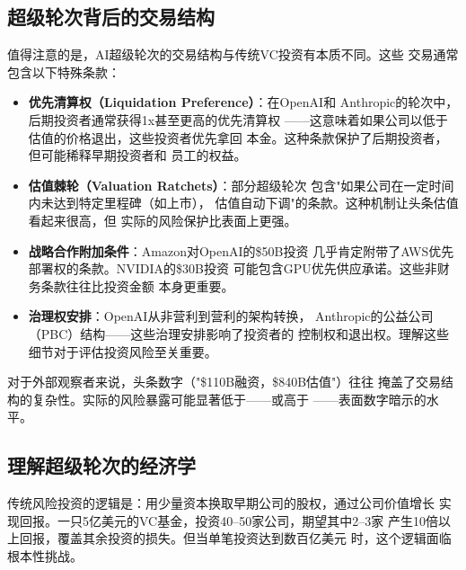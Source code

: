 \subsection{超级轮次背后的交易结构}
\label{subsec:fund-deal-structure}

值得注意的是，AI超级轮次的交易结构与传统VC投资有本质不同。这些
交易通常包含以下特殊条款：

\begin{itemize}
  \item \textbf{优先清算权（Liquidation Preference）}：在OpenAI和
    Anthropic的轮次中，后期投资者通常获得1x甚至更高的优先清算权
    ——这意味着如果公司以低于估值的价格退出，这些投资者优先拿回
    本金。这种条款保护了后期投资者，但可能稀释早期投资者和
    员工的权益。
  \item \textbf{估值棘轮（Valuation Ratchets）}：部分超级轮次
    包含"如果公司在一定时间内未达到特定里程碑（如上市），
    估值自动下调"的条款。这种机制让头条估值看起来很高，但
    实际的风险保护比表面上更强。
  \item \textbf{战略合作附加条件}：Amazon对OpenAI的\$50B投资
    几乎肯定附带了AWS优先部署权的条款。NVIDIA的\$30B投资
    可能包含GPU优先供应承诺。这些非财务条款往往比投资金额
    本身更重要。
  \item \textbf{治理权安排}：OpenAI从非营利到营利的架构转换，
    Anthropic的公益公司（PBC）结构——这些治理安排影响了投资者的
    控制权和退出权。理解这些细节对于评估投资风险至关重要。
\end{itemize}

对于外部观察者来说，头条数字（"\$110B融资，\$840B估值"）往往
掩盖了交易结构的复杂性。实际的风险暴露可能显著低于——或高于
——表面数字暗示的水平。

\subsection{理解超级轮次的经济学}
\label{subsec:fund-megaround-economics}

传统风险投资的逻辑是：用少量资本换取早期公司的股权，通过公司价值增长
实现回报。一只5亿美元的VC基金，投资40--50家公司，期望其中2--3家
产生10倍以上回报，覆盖其余投资的损失。但当单笔投资达到数百亿美元
时，这个逻辑面临根本性挑战。

